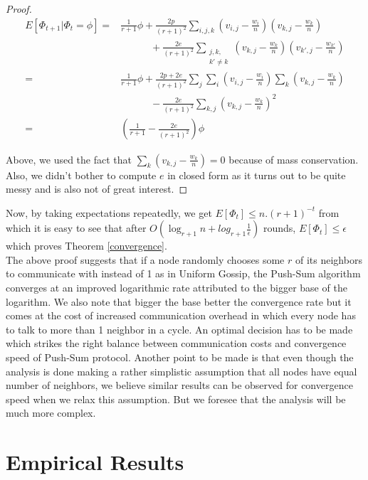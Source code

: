 \documentclass[runningheads,a4paper]{llncs}
\begin{document}
\begin{proof}
\begin{align*}
E[\Phi_{t+1}|\Phi_t=\phi] =& \frac{1}{r+1}\phi + \frac{2p}{(r+1)^2} \sum\limits_{i,j,k}(v_{i,j}-\frac{w_i}{n})(v_{k,j}-\frac{w_k}{n}) \\
&\qquad\quad+ \frac{2e}{(r+1)^2} \sum\limits_{\substack{j,k, \\ k' \neq k}} (v_{k,j}-\frac{w_k}{n})(v_{k',j}-\frac{w_{k'}}{n}) \\
=& \frac{1}{r+1}\phi + \frac{2p+2e}{(r+1)^2}\sum\limits_j \sum\limits_i (v_{i,j} - \frac{w_i}{n}) \sum\limits_k(v_{k,j}-\frac{w_k}{n}) \\
&\qquad\quad- \frac{2e}{(r+1)^2} \sum\limits_{k,j}(v_{k,j}-\frac{w_k}{n})^2 \\
=& \left( \frac{1}{r+1} - \frac{2e}{(r+1)^2} \right) \phi
\end{align*}

Above, we used the fact that $\sum\limits_k(v_{k,j}-\frac{w_k}{n})=0$ because of mass conservation. Also, we didn't bother to compute $e$ in closed form as it turns out to be quite messy and is also not of great interest.
\end{proof}
Now, by taking expectations repeatedly, we get $E[\Phi_t] \leq n.(r+1)^{-t}$ from which it is easy to see that after $O(\log_{r+1} n + log_{r+1} \frac{1}{\epsilon})$ rounds, $E[\Phi_t] \leq \epsilon$ which proves Theorem \ref{convergence}. \\
The above proof suggests that if a node randomly chooses some $r$ of its neighbors to communicate with instead of 1 as in Uniform Gossip, the Push-Sum algorithm converges at an improved logarithmic rate attributed to the bigger base of the logarithm. We also note that bigger the base better the convergence rate but it comes at the cost of increased communication overhead in which every node has to talk to more than 1 neighbor in a cycle. An optimal decision has to be made which strikes the right balance between communication costs and convergence speed of Push-Sum protocol. Another point to be made is that even though the analysis is done making a rather simplistic assumption that all nodes have equal number of neighbors, we believe similar results can be observed for convergence speed when we relax this assumption. But we foresee that the analysis will be much more complex.

\section{Empirical Results}
\end{document}
